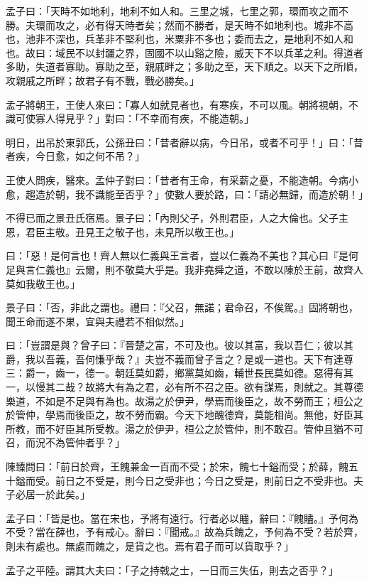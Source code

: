 
\begin{pinyinscope}
孟子曰：「天時不如地利，地利不如人和。三里之城，七里之郭，環而攻之而不勝。夫環而攻之，必有得天時者矣；然而不勝者，是天時不如地利也。城非不高也，池非不深也，兵革非不堅利也，米粟非不多也；委而去之，是地利不如人和也。故曰：域民不以封疆之界，固國不以山谿之險，威天下不以兵革之利。得道者多助，失道者寡助。寡助之至，親戚畔之；多助之至，天下順之。以天下之所順，攻親戚之所畔；故君子有不戰，戰必勝矣。」

孟子將朝王，王使人來曰：「寡人如就見者也，有寒疾，不可以風。朝將視朝，不識可使寡人得見乎？」對曰：「不幸而有疾，不能造朝。」

明日，出吊於東郭氏，公孫丑曰：「昔者辭以病，今日吊，或者不可乎！」曰：「昔者疾，今日愈，如之何不吊？」

王使人問疾，醫來。孟仲子對曰：「昔者有王命，有采薪之憂，不能造朝。今病小愈，趨造於朝，我不識能至否乎？」使數人要於路，曰：「請必無歸，而造於朝！」

不得已而之景丑氏宿焉。景子曰：「內則父子，外則君臣，人之大倫也。父子主恩，君臣主敬。丑見王之敬子也，未見所以敬王也。」

曰：「惡！是何言也！齊人無以仁義與王言者，豈以仁義為不美也？其心曰『是何足與言仁義也』云爾，則不敬莫大乎是。我非堯舜之道，不敢以陳於王前，故齊人莫如我敬王也。」

景子曰：「否，非此之謂也。禮曰：『父召，無諾；君命召，不俟駕。』固將朝也，聞王命而遂不果，宜與夫禮若不相似然。」

曰：「豈謂是與？曾子曰：『晉楚之富，不可及也。彼以其富，我以吾仁；彼以其爵，我以吾義，吾何慊乎哉？』夫豈不義而曾子言之？是或一道也。天下有達尊三：爵一，齒一，德一。朝廷莫如爵，鄉黨莫如齒，輔世長民莫如德。惡得有其一，以慢其二哉？故將大有為之君，必有所不召之臣。欲有謀焉，則就之。其尊德樂道，不如是不足與有為也。故湯之於伊尹，學焉而後臣之，故不勞而王；桓公之於管仲，學焉而後臣之，故不勞而霸。今天下地醜德齊，莫能相尚。無他，好臣其所教，而不好臣其所受教。湯之於伊尹，桓公之於管仲，則不敢召。管仲且猶不可召，而況不為管仲者乎？」

陳臻問曰：「前日於齊，王餽兼金一百而不受；於宋，餽七十鎰而受；於薛，餽五十鎰而受。前日之不受是，則今日之受非也；今日之受是，則前日之不受非也。夫子必居一於此矣。」

孟子曰：「皆是也。當在宋也，予將有遠行。行者必以贐，辭曰：『餽贐。』予何為不受？當在薛也，予有戒心。辭曰：『聞戒。』故為兵餽之，予何為不受？若於齊，則未有處也。無處而餽之，是貨之也。焉有君子而可以貨取乎？」

孟子之平陸。謂其大夫曰：「子之持戟之士，一日而三失伍，則去之否乎？」


\end{pinyinscope}
